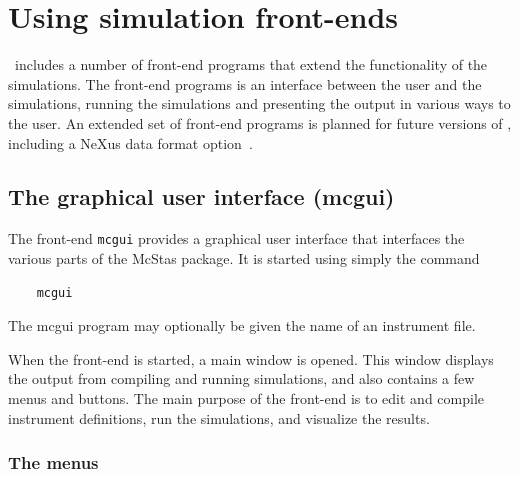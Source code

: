 \section{Using simulation front-ends}
\label{s:frontends}

\MCS\ includes a number of front-end programs that extend the
functionality of the simulations. The front-end programs is an interface
between the user and the simulations, running the simulations and
presenting the output in various ways to the user.
An extended set of front-end programs is planned for future versions of
\MCS, including a NeXus data format option~\cite{nexus_webpage}.


\subsection{The graphical user interface (mcgui)}
\label{s:mcgui}

The front-end \verb+mcgui+ provides a graphical user interface that
interfaces the various parts of the McStas package. It is started using
simply the command
\begin{verbatim}
    mcgui
\end{verbatim}
The mcgui program may optionally be given the name of an instrument file.

When the front-end is started, a main window is opened. This window
displays the output from compiling and running simulations, and also
contains a few menus and buttons. The main purpose of the front-end is
to edit and compile instrument definitions, run the simulations, and
visualize the results.

\subsubsection{The menus}

